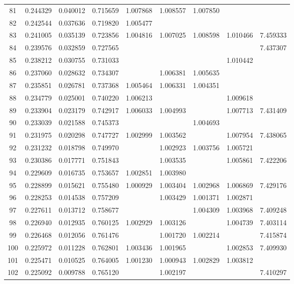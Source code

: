 \documentclass{elsarticle}
\begin{document}
\begin{center}
\begin{longtable}{|c|ccc|cccc|c|}
  81 & 0.244329 & 0.040012 & 0.715659 & 1.007868 & 1.008557 & 1.007850 &  &  \\
  82 & 0.242544 & 0.037636 & 0.719820 & 1.005477 &  &  &  &  \\
  83 & 0.241005 & 0.035139 & 0.723856 & 1.004816 & 1.007025 & 1.008598 & 1.010466 & 7.459333 \\
  84 & 0.239576 & 0.032859 & 0.727565 &  &  &  &  & 7.437307 \\
  85 & 0.238212 & 0.030755 & 0.731033 &  &  &  & 1.010442 &  \\
  86 & 0.237060 & 0.028632 & 0.734307 &  & 1.006381 & 1.005635 &  &  \\
  87 & 0.235851 & 0.026781 & 0.737368 & 1.005464 & 1.006331 & 1.004351 &  &  \\
  88 & 0.234779 & 0.025001 & 0.740220 & 1.006213 &  &  & 1.009618 &  \\
  89 & 0.233904 & 0.023179 & 0.742917 & 1.006033 & 1.004993 &  & 1.007713 & 7.431409 \\
  90 & 0.233039 & 0.021588 & 0.745373 &  &  & 1.004693 &  &  \\
  91 & 0.231975 & 0.020298 & 0.747727 & 1.002999 & 1.003562 &  & 1.007954 & 7.438065 \\
  92 & 0.231232 & 0.018798 & 0.749970 &  & 1.002923 & 1.003756 & 1.005721 &  \\
  93 & 0.230386 & 0.017771 & 0.751843 &  & 1.003535 &  & 1.005861 & 7.422206 \\
  94 & 0.229609 & 0.016735 & 0.753657 & 1.002851 & 1.003980 &  &  &  \\
  95 & 0.228899 & 0.015621 & 0.755480 & 1.000929 & 1.003404 & 1.002968 & 1.006869 & 7.429176 \\
  96 & 0.228253 & 0.014538 & 0.757209 &  & 1.003429 & 1.001371 & 1.002871 &  \\
  97 & 0.227611 & 0.013712 & 0.758677 &  &  & 1.004309 & 1.003968 & 7.409248 \\
  98 & 0.226940 & 0.012935 & 0.760125 & 1.002929 & 1.003126 &  & 1.004739 & 7.403114 \\
  99 & 0.226468 & 0.012056 & 0.761476 &  & 1.001720 & 1.002214 &  & 7.415874 \\
  100 & 0.225972 & 0.011228 & 0.762801 & 1.003436 & 1.001965 &  & 1.002853 & 7.409930 \\
  101 & 0.225471 & 0.010525 & 0.764005 & 1.001230 & 1.000943 & 1.002829 & 1.003812 &  \\
  102 & 0.225092 & 0.009788 & 0.765120 &  & 1.002197 &  &  & 7.410297 \\

\end{longtable}
\end{center}
\end{document}
